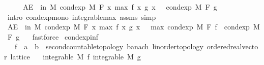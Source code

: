 \begin{isabellebody}
\ \ \isamarkupfalse%
\ \isamarkupfalse%
\ {\isachardoublequoteopen}AE\ {\isasymxi}\ in\ M{\isachardot}{\kern0pt}\ cond{\isacharunderscore}{\kern0pt}exp\ M\ F\ {\isacharparenleft}{\kern0pt}{\isasymlambda}x{\isachardot}{\kern0pt}\ max\ {\isacharparenleft}{\kern0pt}f\ x{\isacharparenright}{\kern0pt}\ {\isacharparenleft}{\kern0pt}g\ x{\isacharparenright}{\kern0pt}{\isacharparenright}{\kern0pt}\ {\isasymxi}\ {\isasymge}\ cond{\isacharunderscore}{\kern0pt}exp\ M\ F\ g\ {\isasymxi}{\isachardoublequoteclose}\ \isamarkupfalse%
\ {\isacharparenleft}{\kern0pt}intro\ cond{\isacharunderscore}{\kern0pt}exp{\isacharunderscore}{\kern0pt}mono\ integrable{\isacharunderscore}{\kern0pt}max\ assms{\isacharcomma}{\kern0pt}\ simp{\isacharparenright}{\kern0pt}\isanewline
\ \ \isamarkupfalse%
\ \isamarkupfalse%
\ {\isachardoublequoteopen}AE\ {\isasymxi}\ in\ M{\isachardot}{\kern0pt}\ cond{\isacharunderscore}{\kern0pt}exp\ M\ F\ {\isacharparenleft}{\kern0pt}{\isasymlambda}x{\isachardot}{\kern0pt}\ max\ {\isacharparenleft}{\kern0pt}f\ x{\isacharparenright}{\kern0pt}\ {\isacharparenleft}{\kern0pt}g\ x{\isacharparenright}{\kern0pt}{\isacharparenright}{\kern0pt}\ {\isasymxi}\ {\isasymge}\ max\ {\isacharparenleft}{\kern0pt}cond{\isacharunderscore}{\kern0pt}exp\ M\ F\ f\ {\isasymxi}{\isacharparenright}{\kern0pt}\ {\isacharparenleft}{\kern0pt}cond{\isacharunderscore}{\kern0pt}exp\ M\ F\ g\ {\isasymxi}{\isacharparenright}{\kern0pt}{\isachardoublequoteclose}\ \isamarkupfalse%
\ fastforce\isanewline
{}\isamarkupfalse%
%
\endisatagproof
{\isafoldproof}%
%
\isadelimproof
\isanewline
%
\endisadelimproof
\isanewline
{}\isamarkupfalse%
\ cond{\isacharunderscore}{\kern0pt}exp{\isacharunderscore}{\kern0pt}inf{\isacharcolon}{\kern0pt}\isanewline
\ \ \ f\ {\isacharcolon}{\kern0pt}{\isacharcolon}{\kern0pt}\ {\isachardoublequoteopen}{\isacharprime}{\kern0pt}a\ {\isasymRightarrow}\ {\isacharprime}{\kern0pt}b\ {\isacharcolon}{\kern0pt}{\isacharcolon}{\kern0pt}\ {\isacharbraceleft}{\kern0pt}second{\isacharunderscore}{\kern0pt}countable{\isacharunderscore}{\kern0pt}topology{\isacharcomma}{\kern0pt}\ banach{\isacharcomma}{\kern0pt}\ linorder{\isacharunderscore}{\kern0pt}topology{\isacharcomma}{\kern0pt}\ ordered{\isacharunderscore}{\kern0pt}real{\isacharunderscore}{\kern0pt}vector{\isacharcomma}{\kern0pt}\ lattice{\isacharbraceright}{\kern0pt}{\isachardoublequoteclose}\isanewline
\ \ \ {\isachardoublequoteopen}integrable\ M\ f{\isachardoublequoteclose}\ {\isachardoublequoteopen}integrable\ M\ g{\isachardoublequoteclose}\isanewline

\end{isabellebody}
